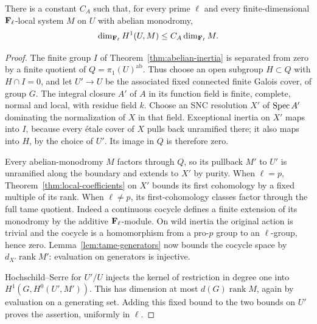 \begin{lemma}\label{lem:abelian-coefficients}
There is a constant $C_A$ such that, for every prime $\ell$ and every finite-dimensional $\mathbf F_\ell$-local system $M$ on $U$ with abelian monodromy,
\[
 \dim_{\mathbf F_\ell}H^1(U,M)\leq C_A\dim_{\mathbf F_\ell}M.
\]
\end{lemma}
\begin{proof}
The finite group $I$ of Theorem~\ref{thm:abelian-inertia} is separated from zero by a finite quotient of $Q=\pi_1(U)^{\mathrm{ab}}$. Thus choose an open subgroup $H\subset Q$ with $H\cap I=0$, and let $U'\to U$ be the associated fixed connected finite Galois cover, of group $G$. The integral closure $A'$ of $A$ in its function field is finite, complete, normal and local, with residue field $k$. Choose an SNC resolution $X'$ of $\operatorname{Spec} A'$ dominating the normalization of $X$ in that field. Exceptional inertia on $X'$ maps into $I$, because every \'etale cover of $X$ pulls back unramified there; it also maps into $H$, by the choice of $U'$. Its image in $Q$ is therefore zero.

Every abelian-monodromy $M$ factors through $Q$, so its pullback $M'$ to $U'$ is unramified along the boundary and extends to $X'$ by purity. When $\ell=p$, Theorem~\ref{thm:local-coefficients} on $X'$ bounds its first cohomology by a fixed multiple of its rank. When $\ell\ne p$, its first-cohomology classes factor through the full tame quotient. Indeed a continuous cocycle defines a finite extension of its monodromy by the additive $\mathbf F_\ell$-module. On wild inertia the original action is trivial and the cocycle is a homomorphism from a pro-$p$ group to an $\ell$-group, hence zero. Lemma~\ref{lem:tame-generators} now bounds the cocycle space by $d_{X'}\operatorname{rank}M'$: evaluation on generators is injective.

Hochschild--Serre for $U'/U$ injects the kernel of restriction in degree one into $H^1(G,H^0(U',M'))$. This has dimension at most $d(G)\operatorname{rank}M$, again by evaluation on a generating set. Adding this fixed bound to the two bounds on $U'$ proves the assertion, uniformly in $\ell$.
\end{proof}

